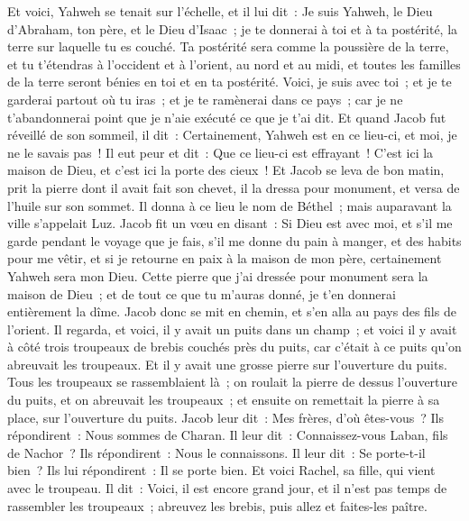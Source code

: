 \begin{multicols}{2}
Et voici, Yahweh se tenait sur l'échelle, et il lui dit~: Je suis Yahweh, le Dieu d'Abraham, ton père, et le Dieu d'Isaac~; je te donnerai à toi et à ta postérité, la terre sur laquelle tu es couché.
Ta postérité sera comme la poussière de la terre, et tu t'étendras à l'occident et à l'orient, au nord et au midi, et toutes les familles de la terre seront bénies en toi et en ta postérité.
Voici, je suis avec toi~; et je te garderai partout où tu iras~; et je te ramènerai dans ce pays~; car je ne t'abandonnerai point que je n'aie exécuté ce que je t'ai dit.
Et quand Jacob fut réveillé de son sommeil, il dit~: Certainement, Yahweh est en ce lieu-ci, et moi, je ne le savais pas~!
Il eut peur et dit~: Que ce lieu-ci est effrayant~! C'est ici la maison de Dieu, et c'est ici la porte des cieux~!
Et Jacob se leva de bon matin, prit la pierre dont il avait fait son chevet, il la dressa pour monument, et versa de l'huile sur son sommet.
Il donna à ce lieu le nom de Béthel~; mais auparavant la ville s'appelait Luz.
Jacob fit un vœu en disant~: Si Dieu est avec moi, et s'il me garde pendant le voyage que je fais, s'il me donne du pain à manger, et des habits pour me vêtir,
et si je retourne en paix à la maison de mon père, certainement Yahweh sera mon Dieu.
Cette pierre que j'ai dressée pour monument sera la maison de Dieu~; et de tout ce que tu m'auras donné, je t'en donnerai entièrement la dîme.
\VerseOne{}Jacob donc se mit en chemin, et s'en alla au pays des fils de l'orient.
Il regarda, et voici, il y avait un puits dans un champ~; et voici il y avait à côté trois troupeaux de brebis couchés près du puits, car c'était à ce puits qu'on abreuvait les troupeaux. Et il y avait une grosse pierre sur l'ouverture du puits.
Tous les troupeaux se rassemblaient là~; on roulait la pierre de dessus l'ouverture du puits, et on abreuvait les troupeaux~; et ensuite on remettait la pierre à sa place, sur l'ouverture du puits.
Jacob leur dit~: Mes frères, d'où êtes-vous~? Ils répondirent~: Nous sommes de Charan.
Il leur dit~: Connaissez-vous Laban, fils de Nachor~? Ils répondirent~: Nous le connaissons.
Il leur dit~: Se porte-t-il bien~? Ils lui répondirent~: Il se porte bien. Et voici Rachel, sa fille, qui vient avec le troupeau.
Il dit~: Voici, il est encore grand jour, et il n'est pas temps de rassembler les troupeaux~; abreuvez les brebis, puis allez et faites-les paître.

\end{multicols}
